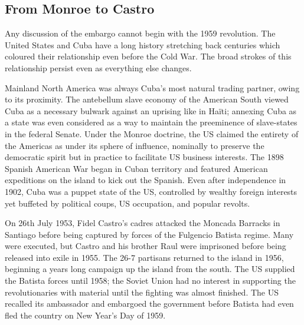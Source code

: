 \documentclass[letterpaper,12pt,twoside]{article} %
\begin{document}
\begin{multicols}{2}

\section{From Monroe to Castro}

Any discussion of the embargo cannot begin with the 1959 revolution. The United States and Cuba have a long history stretching back centuries which coloured their relationship even before the Cold War. The broad strokes of this relationship persist even as everything else changes.

Mainland North America was always Cuba's most natural trading partner, owing to its proximity. The antebellum slave economy of the American South viewed Cuba as a necessary bulwark against an uprising like in Haïti; annexing Cuba as a state was even considered as a way to maintain the preeminence of slave-states in the federal Senate. Under the Monroe doctrine, the US claimed the entirety of the Americas as under its sphere of influence, nominally to preserve the democratic spirit but in practice to facilitate US business interests. The 1898 Spanish American War began in Cuban territory and featured American expeditions on the island to kick out the Spanish. Even after independence in 1902, Cuba was a puppet state of the US, controlled by wealthy foreign interests yet buffeted by political coups, US occupation, and popular revolts.

On 26th July 1953, Fidel Castro's cadres attacked the Moncada Barracks in Santiago before being captured by forces of the Fulgencio Batista regime. Many were executed, but Castro and his brother Raul were imprisoned before being released into exile in 1955. The 26-7 partisans returned to the island in 1956, beginning a years long campaign up the island from the south. The US supplied the Batista forces until 1958; the Soviet Union had no interest in supporting the revolutionaries with material until the fighting was almost finished.\autocite{samson2008soviets} The US recalled its ambassador and embargoed the government before Batista had even fled the country on New Year's Day of 1959.


\end{multicols}
\end{document}
